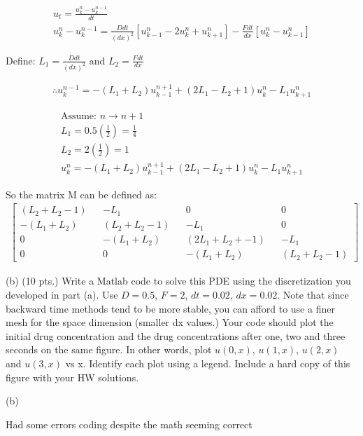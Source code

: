 \documentclass{article}
\begin{document}
\begin{align*}
	u_{t} = \frac{u^{n}_{k} - u^{n-1}_{k}}{dt} \\
	u^{n}_{k} - u^{n-1}_{k} = \frac{D dt}{(dx)^{2}} [u^{n}_{k-1} - 2u^{n}_{k} + u^{n}_{k+1}] - \frac{F dt}{dx}[u^{n}_{k} - u^{n}_{k-1}]
\end{align*}

Define: $L_{1} = \frac{Ddt}{(dx)^{2}}$ and $L_{2} = \frac{Fdt}{dx}$

\begin{align*}
\therefore  u^{n-1}_{k} = - (L_{1} + L_{2})u^{n+1}_{k-1} + (2L_{1} - L_{2} + 1)u^{n}_{k} - L_{1}u^{n}_{k+1}
\end{align*}

\begin{align*}
\text{Assume: } n \rightarrow n + 1 \\
L_{1} = 0.5(\frac{1}{2}) = \frac{1}{4} \\
L_{2} = 2(\frac{1}{2}) = 1 \\
u^{n}_{k} = - (L_{1} + L_{2})u^{n+1}_{k-1} + (2L_{1} - L_{2} + 1)u^{n}_{k} - L_{1}u^{n}_{k+1}
\end{align*}

So the matrix M can be defined as:
\begin{align*}
\begin{bmatrix} (L_{2} + L_{2} - 1) && -L_{1} && 0 && 0\\ -(L_{1} + L_{2}) && (L_{2} + L_{2} - 1) && -L_{1} && 0\\ 0 &&  -(L_{1}+ L_{2}) && (2L_{1} + L_{2} + -1) && -L_{1} \\0 && 0 && -(L_{1} + L_{2}) && (L_{2} + L_{2} - 1) \end{bmatrix}
\end{align*}

(b) (10 pts.) Write a Matlab code to solve this PDE using the discretization you developed in part (a). Use $D = 0.5$, $F = 2$, $dt = 0.02$, $dx = 0.02$. Note that since backward time methods tend to be more stable, you can afford to use a finer mesh for the space dimension (smaller dx values.) Your code should plot the initial drug concentration and the drug concentrations after one, two and three seconds on the same figure. In other words, plot $u(0, x)$, $u(1, x)$, $u(2, x)$ and $u(3, x)$ vs x. Identify each plot using a legend. Include a hard copy of this figure with your HW solutions.

(b)

Had some errors coding despite the math seeming correct
\end{document}
